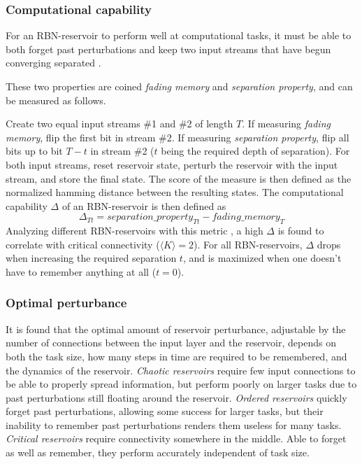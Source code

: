 \subsubsection{Computational capability}
\label{section:computational-capability}
For an RBN-reservoir to perform well at computational tasks,
it must be able to both forget past perturbations and keep two input streams that have begun converging separated \cite{bertschinger2004real}.

These two properties are coined \textit{fading memory} and \textit{separation property},
and can be measured \cite{rbn-reservoir} as follows.

Create two equal input streams \#1 and \#2 of length $T$.
If measuring \textit{fading memory}, flip the first bit in stream \#2.
If measuring \textit{separation property}, flip all bits up to bit $T-t$ in stream \#2
($t$ being the required depth of separation).
For both input streams, reset reservoir state, perturb the reservoir with the input stream,
and store the final state.
The score of the measure is then defined as the normalized hamming distance between the resulting states.
The computational capability $\Delta$ of an RBN-reservoir is then defined as
\begin{equation}
  \Delta_{Tt} = separation\_property_{Tt} - fading\_memory_{T}
\label{formula:accuracy}
\end{equation}
Analyzing different RBN-reservoirs with this metric \cite{rbn-reservoir},
a high $\Delta$ is found to correlate with critical connectivity ($\langle K \rangle = 2$).
For all RBN-reservoirs, $\Delta$ drops when increasing the required separation $t$,
and is maximized when one doesn't have to remember anything at all ($t=0$).

\subsubsection{Optimal perturbance}
It is found that the optimal amount of reservoir perturbance,
adjustable by the number of connections between the input layer and the reservoir,
depends on both the task size, how many steps in time are required to be remembered,
and the dynamics of the reservoir.
\textit{Chaotic reservoirs} require few input connections to be able to properly spread information,
but perform poorly on larger tasks due to past perturbations still floating around the reservoir.
\textit{Ordered reservoirs} quickly forget past perturbations, allowing some success for larger tasks,
but their inability to remember past perturbations renders them useless for many tasks.
\textit{Critical reservoirs} require connectivity somewhere in the middle.
Able to forget as well as remember, they perform accurately independent of task size.

